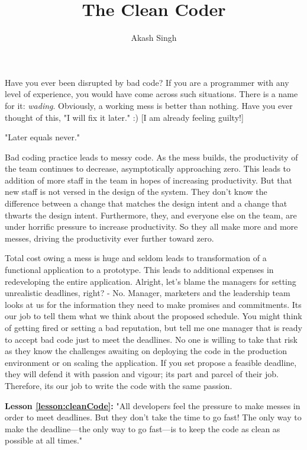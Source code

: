 \documentclass[12pt]{article}
\title{\Large \textbf{The Clean Coder}}
\author{Akash Singh}
\affil{School of Computer Science, McGill University, Montreal, Canada}
\date{}
\newcounter{lessoncounter}
\newcommand{\lesson}[1]{\refstepcounter{lessoncounter}\label{#1}}
\begin{document}
\maketitle


Have you ever been disrupted by bad code? If you are a programmer with any level of experience, you would have come across such situations. There is a name for it: \textit{wading}. Obviously, a working mess is better than nothing. Have you ever thought of this, "I will fix it later." :) [I am already feeling guilty!]

"Later equals never."

Bad coding practice leads to messy code. As the mess builds, the productivity of the team continues to decrease, asymptotically approaching zero. This leads to addition of more staff in the team in hopes of increasing productivity. But that new staff is not versed in the design of the system. They don’t know the difference between a change that matches the design intent and a change that thwarts the design intent. Furthermore, they, and everyone else on the team, are under horrific pressure to increase productivity. So they all make more and more messes, driving the productivity ever further toward zero.

Total cost owing a mess is huge and seldom leads to transformation of a functional application to a prototype. This leads to additional expenses in redeveloping the entire application. Alright, let's blame the managers for setting unrealistic deadlines, right? - No. Manager, marketers and the leadership team looks at us for the information they need to make promises and commitments. Its our job to tell them what we think about the proposed schedule. You might think of getting fired or setting a bad reputation, but tell me one manager that is ready to accept bad code just to meet the deadlines. No one is willing to take that risk as they know the challenges awaiting on deploying the code in the production environment or on scaling the application. If you set propose a feasible deadline, they will defend it with passion and vigour; its part and parcel of their job. Therefore, its our job to write the code with the same passion.
\begin{myquote}
\lesson{lesson:cleanCode}
\textbf{Lesson \ref{lesson:cleanCode}:} "All developers feel the pressure to make messes in order to meet deadlines. But they don’t take the time to go fast! The only way to make the deadline—the only way to go fast—is to keep the code as clean as possible at all times."
\end{myquote}
\end{document}
